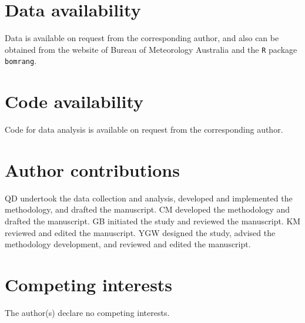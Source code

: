 \documentclass[fleqn,10pt]{wlscirep}
\begin{document}
\section*{Data availability}
Data is available on request from the corresponding author, and also can be obtained from the website of Bureau of Meteorology Australia and the \texttt{R} package \texttt{bomrang}.
\section*{Code availability}
Code for data analysis is available on request from the corresponding author.
\section*{Author contributions}
QD undertook the data collection and analysis, developed and implemented the methodology, and drafted the manuscript. CM developed the methodology and drafted the manuscript. GB initiated the study and reviewed the manuscript. KM reviewed and edited the manuscript. YGW designed the study, advised the methodology development, and reviewed and edited the manuscript.

\section*{Competing interests}
The author(s) declare no competing interests.


% 
%


\end{document}
